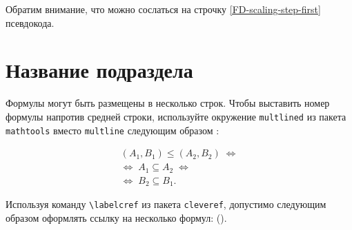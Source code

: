 \begin{refsection}
	Обратим внимание, что можно сослаться на строчку \ref{FD-scaling-step-first} псевдокода. 
	
	
	
	\section{Название подраздела} \label{sect1_4} %

	
	Формулы могут быть размещены в несколько строк. Чтобы выставить номер формулы напротив средней строки, используйте окружение \verb|multlined| из пакета \verb|mathtools| вместо \verb|multline| следующим образом \cite{Ganter1999}:

\begin{equation} %
\label{eq-fConcept-order-G}
\begin{multlined}
(A_1,B_1)\leq (A_2,B_2)\; \Leftrightarrow \\  \Leftrightarrow\; A_1\subseteq A_2\; \Leftrightarrow \\ \Leftrightarrow\; B_2\subseteq B_1. 
\end{multlined}
\end{equation}


Используя команду \verb|\labelcref| из пакета \verb|cleveref|, допустимо следующим образом оформлять ссылку на несколько формул:
().





\end{refsection}

